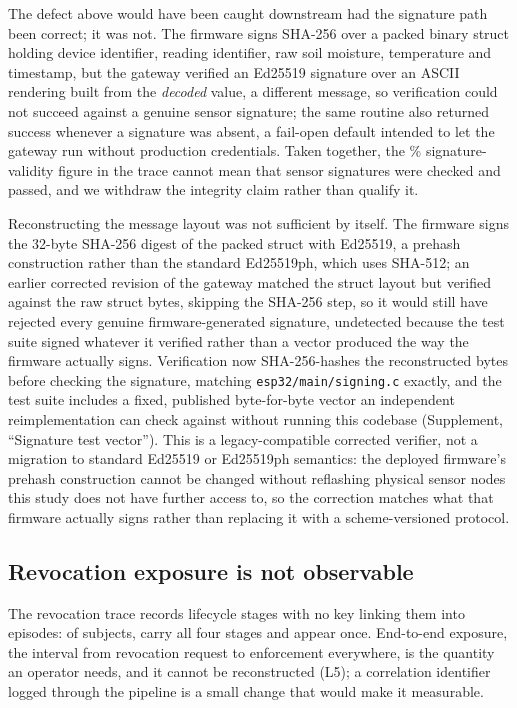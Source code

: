 \documentclass[a4paper,fleqn]{cas-sc}
\begin{document}
The defect above would have been caught downstream had the signature path
been correct; it was not. The firmware signs SHA-256 over a packed binary
struct holding device identifier, reading identifier, raw soil moisture,
temperature and timestamp, but the gateway verified an Ed25519 signature
over an ASCII rendering built from the \emph{decoded} value, a different
message, so verification could not succeed against a genuine sensor
signature; the same routine also returned success whenever a signature
was absent, a fail-open default intended to let the gateway run without
production credentials. Taken together, the \SigValidPct\%
signature-validity figure in the trace cannot mean that sensor signatures
were checked and passed, and we withdraw the integrity claim rather than
qualify it.

Reconstructing the message layout was not sufficient by itself. The
firmware signs the 32-byte SHA-256 digest of the packed struct with
Ed25519, a prehash construction rather than the standard Ed25519ph, which
uses SHA-512; an earlier corrected revision of the gateway matched the
struct layout but verified against the raw struct bytes, skipping the
SHA-256 step, so it would still have rejected every genuine
firmware-generated signature, undetected because the test suite signed
whatever it verified rather than a vector produced the way the firmware
actually signs. Verification now SHA-256-hashes the reconstructed bytes
before checking the signature, matching \texttt{esp32/main/signing.c}
exactly, and the test suite includes a fixed, published byte-for-byte
vector an independent reimplementation can check against without running
this codebase (Supplement, ``Signature test vector''). This is a
legacy-compatible corrected verifier, not a migration to standard
Ed25519 or Ed25519ph semantics: the deployed firmware's prehash
construction cannot be changed without reflashing physical sensor nodes
this study does not have further access to, so the correction matches
what that firmware actually signs rather than replacing it with a
scheme-versioned protocol.

\subsection{Revocation exposure is not observable}
\label{subsec:pm_revocation}

The revocation trace records lifecycle stages with no key linking them
into episodes: of \RevSubjects{} subjects, \RevComplete{} carry all four
stages and \RevSingleStage{} appear once. End-to-end exposure, the
interval from revocation request to enforcement everywhere, is the
quantity an operator needs, and it cannot be reconstructed (L5); a
correlation identifier logged through the pipeline is a small change that
would make it measurable.
\end{document}

